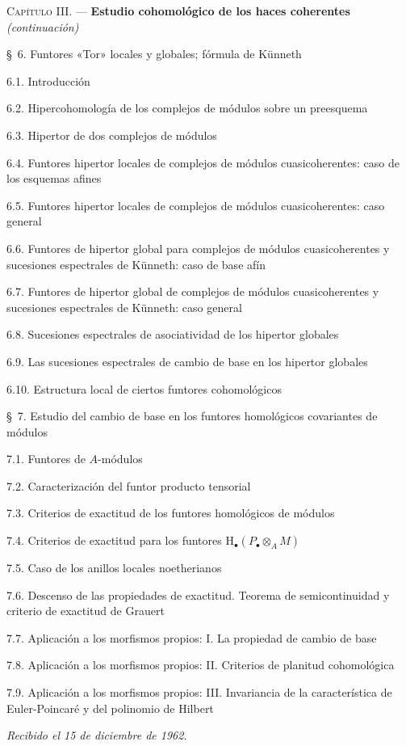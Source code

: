 \begin{flushleft}
\textsc{Capítulo III.} --- \textbf{Estudio cohomológico de los haces coherentes}
\textit{(continuación)} 

\medskip
\S~6. Funtores «Tor» locales y globales; fórmula de Künneth 

6.1. Introducción 

6.2. Hipercohomología de los complejos de módulos sobre un preesquema 

6.3. Hipertor de dos complejos de módulos 

6.4. Funtores hipertor locales de complejos de módulos cuasicoherentes: caso
de los esquemas afines 

6.5. Funtores hipertor locales de complejos de módulos cuasicoherentes: caso
general 

6.6. Funtores de hipertor global para complejos de módulos cuasicoherentes y
sucesiones espectrales de Künneth: caso de base afín 

6.7. Funtores de hipertor global de complejos de módulos cuasicoherentes y
sucesiones espectrales de Künneth: caso general 

6.8. Sucesiones espectrales de asociatividad de los hipertor globales 

6.9. Las sucesiones espectrales de cambio de base en los hipertor globales

6.10. Estructura local de ciertos funtores cohomológicos 

\medskip
\S~7. Estudio del cambio de base en los funtores homológicos covariantes de
módulos 

7.1. Funtores de $A$-módulos 

7.2. Caracterización del funtor producto tensorial 

7.3. Criterios de exactitud de los funtores homológicos de módulos 

7.4. Criterios de exactitud para los funtores
$\mathrm H_\bullet(P_\bullet\otimes_A M)$ 

7.5. Caso de los anillos locales noetherianos 

7.6. Descenso de las propiedades de exactitud. Teorema de semicontinuidad y
criterio de exactitud de Grauert 

7.7. Aplicación a los morfismos propios: I. La propiedad de cambio de base

7.8. Aplicación a los morfismos propios: II. Criterios de planitud
cohomológica 

7.9. Aplicación a los morfismos propios: III. Invariancia de la
característica de Euler-Poincaré y del polinomio de Hilbert 

\begin{flushright}
\emph{Recibido el 15 de diciembre de 1962.}
\end{flushright}
\end{flushleft}

